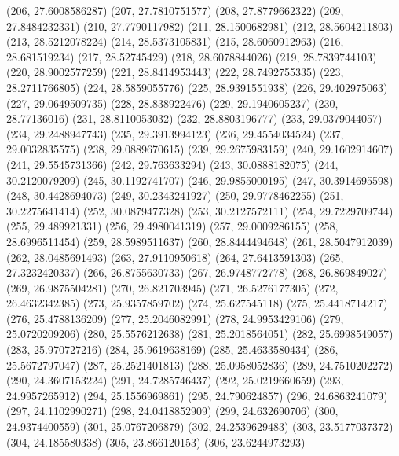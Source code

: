 {					(206, 27.6008586287)
					(207, 27.7810751577)
					(208, 27.8779662322)
					(209, 27.8484232331)
					(210, 27.7790117982)
					(211, 28.1500682981)
					(212, 28.5604211803)
					(213, 28.5212078224)
					(214, 28.5373105831)
					(215, 28.6060912963)
					(216, 28.681519234)
					(217, 28.52745429)
					(218, 28.6078844026)
					(219, 28.7839744103)
					(220, 28.9002577259)
					(221, 28.8414953443)
					(222, 28.7492755335)
					(223, 28.2711766805)
					(224, 28.5859055776)
					(225, 28.9391551938)
					(226, 29.402975063)
					(227, 29.0649509735)
					(228, 28.838922476)
					(229, 29.1940605237)
					(230, 28.77136016)
					(231, 28.8110053032)
					(232, 28.8803196777)
					(233, 29.0379044057)
					(234, 29.2488947743)
					(235, 29.3913994123)
					(236, 29.4554034524)
					(237, 29.0032835575)
					(238, 29.0889670615)
					(239, 29.2675983159)
					(240, 29.1602914607)
					(241, 29.5545731366)
					(242, 29.763633294)
					(243, 30.0888182075)
					(244, 30.2120079209)
					(245, 30.1192741707)
					(246, 29.9855000195)
					(247, 30.3914695598)
					(248, 30.4428694073)
					(249, 30.2343241927)
					(250, 29.9778462255)
					(251, 30.2275641414)
					(252, 30.0879477328)
					(253, 30.2127572111)
					(254, 29.7229709744)
					(255, 29.489921331)
					(256, 29.4980041319)
					(257, 29.0009286155)
					(258, 28.6996511454)
					(259, 28.5989511637)
					(260, 28.8444494648)
					(261, 28.5047912039)
					(262, 28.0485691493)
					(263, 27.9110950618)
					(264, 27.6413591303)
					(265, 27.3232420337)
					(266, 26.8755630733)
					(267, 26.9748772778)
					(268, 26.869849027)
					(269, 26.9875504281)
					(270, 26.821703945)
					(271, 26.5276177305)
					(272, 26.4632342385)
					(273, 25.9357859702)
					(274, 25.627545118)
					(275, 25.4418714217)
					(276, 25.4788136209)
					(277, 25.2046082991)
					(278, 24.9953429106)
					(279, 25.0720209206)
					(280, 25.5576212638)
					(281, 25.2018564051)
					(282, 25.6998549057)
					(283, 25.970727216)
					(284, 25.9619638169)
					(285, 25.4633580434)
					(286, 25.5672797047)
					(287, 25.2521401813)
					(288, 25.0958052836)
					(289, 24.7510202272)
					(290, 24.3607153224)
					(291, 24.7285746437)
					(292, 25.0219660659)
					(293, 24.9957265912)
					(294, 25.1556969861)
					(295, 24.790624857)
					(296, 24.6863241079)
					(297, 24.1102990271)
					(298, 24.0418852909)
					(299, 24.632690706)
					(300, 24.9374400559)
					(301, 25.0767206879)
					(302, 24.2539629483)
					(303, 23.5177037372)
					(304, 24.185580338)
					(305, 23.866120153)
					(306, 23.6244973293)
}
